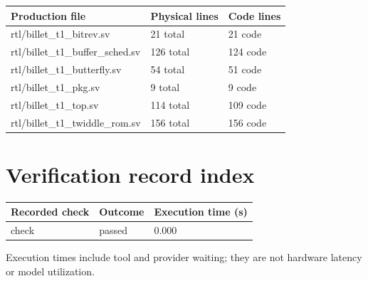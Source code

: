 \documentclass[11pt,a4paper]{article}
\begin{document}
{\small\renewcommand{\arraystretch}{1.18}\begin{longtable}{@{}L{0.55\textwidth}|L{0.18\textwidth}|L{0.18\textwidth}@{}}\toprule

\textbf{Production file} & \textbf{Physical lines} & \textbf{Code lines}\\\midrule\endhead

rtl/\allowbreak{}billet\_\allowbreak{}t1\_\allowbreak{}bitrev.sv & 21 total & 21 code\\[2pt]\hline

rtl/\allowbreak{}billet\_\allowbreak{}t1\_\allowbreak{}buffer\_\allowbreak{}sched.sv & 126 total & 124 code\\[2pt]\hline

rtl/\allowbreak{}billet\_\allowbreak{}t1\_\allowbreak{}butterfly.sv & 54 total & 51 code\\[2pt]\hline

rtl/\allowbreak{}billet\_\allowbreak{}t1\_\allowbreak{}pkg.sv & 9 total & 9 code\\[2pt]\hline

rtl/\allowbreak{}billet\_\allowbreak{}t1\_\allowbreak{}top.sv & 114 total & 109 code\\[2pt]\hline

rtl/\allowbreak{}billet\_\allowbreak{}t1\_\allowbreak{}twiddle\_\allowbreak{}rom.sv & 156 total & 156 code\\[2pt]\hline

\bottomrule\end{longtable}}

\section{Verification record index}

{\small\renewcommand{\arraystretch}{1.18}\begin{longtable}{@{}L{0.57\textwidth}|L{0.16\textwidth}|L{0.17\textwidth}@{}}\toprule

\textbf{Recorded check} & \textbf{Outcome} & \textbf{Execution time (\allowbreak{}s)\allowbreak{}}\\\midrule\endhead

check & passed & 0.000\\[2pt]\hline

\bottomrule\end{longtable}}

Execution times include tool and provider waiting; they are not hardware latency or model utilization.
\end{document}
